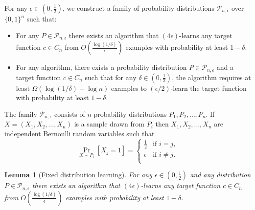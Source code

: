 \documentclass[12pt]{article}
\newtheorem{lemma}[proposition]{Lemma}
\renewcommand{\P}{\mathcal{P}}
\begin{document}
For any $\epsilon \in (0,\frac{1}{2})$,
we construct a family of probability distributions $\P_{n,\epsilon}$ over $\{0,1\}^n$ such that:
\begin{itemize}
\item For any $P \in \P_{n,\epsilon}$ there exists an algorithm that $(4\epsilon)$-learns
any target function $c \in C_n$ from $O \left( \frac{\log(1/\delta)}{\epsilon} \right)$ examples
with probability at least $1-\delta$.
\item For any algorithm, there exists
a probability distribution $P \in \P_{n,\epsilon}$ and a target function $c \in C_n$
such that for any $\delta \in (0,\frac{1}{2})$, the algorithm requires
at least $\Omega(\log(1/\delta) + \log n)$ examples to $(\epsilon/2)$-learn
the target function with probability at least $1-\delta$.
\end{itemize}

The family $\P_{n,\epsilon}$ consists of $n$ probability distributions $P_1, P_2, \dots, P_n$.
If $X = (X_1, X_2, \dots, X_n)$ is a sample drawn from $P_i$ then $X_1, X_2, \dots, X_n$
are independent Bernoulli random variables such that
$$
\Pr_{X \sim P_i}[X_j = 1] =
\begin{cases}
\frac{1}{2} & \text{if $i = j$,} \\
\epsilon & \text{if $i \neq j$.} \\
\end{cases}
$$

\begin{lemma}[Fixed distribution learning]
For any $\epsilon \in (0,\frac{1}{2})$ and any distribution $P \in
\P_{n,\epsilon}$ there exists an algorithm that $(4\epsilon)$-learns any target
function $c \in C_n$ from $O \left( \frac{\log(1/\delta)}{\epsilon} \right)$
examples with probability at least $1 - \delta$.
\end{lemma}
\end{document}

